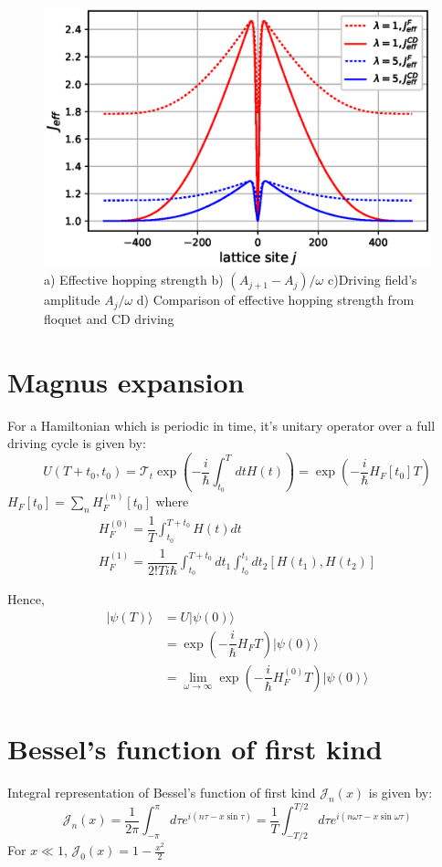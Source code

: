 \documentclass[11pt,a4paper]{article}
\begin{document}
\begin{figure}[!ht]
\begin{center}
\includegraphics[scale=0.5]{pics/j_eff_comp_eckart_potn.eps}
\caption{ a) Effective hopping strength b) $(A_{j+1}-A_{j})/\omega$ c)Driving field's amplitude $A_{j}/\omega$ d) Comparison of effective hopping strength from floquet and CD driving }
\end{center}
\end{figure}

\appendix 
\section{Magnus expansion}
For a Hamiltonian which is periodic in time, it's unitary operator over a full driving cycle is given by:
\begin{equation}
U(T+ t_0, t_0)= \mathcal{T}_t\exp(- \dfrac{i}{\hbar} \int_{t_0}^T dt H(t))= \exp(- \dfrac{i}{\hbar}  H_F[t_0]T)
\end{equation}
$ H_F[t_0]= \sum_n H_F^{(n)}[t_0] $ 
where 
\begin{align*}
H_F^{(0)}= \dfrac{1}{T} \int_{t_0}^{T+t_0} H(t) dt \\
H_F^{(1)}= \dfrac{1}{2! T i \hbar} \int_{t_0}^{T+t_0}  dt_1\int_{t_0}^{t_1} dt_2  [H(t_1), H(t_2)] 
\end{align*}

Hence, 
\begin{align*}
|\psi (T) \rangle &= U |\psi (0) \rangle \\
&= \exp(- \dfrac{i}{\hbar}  H_F T)|\psi (0) \rangle \\
&= \lim_{\omega \rightarrow \infty}\exp(- \dfrac{i}{\hbar}  H_F^{(0)}T)|\psi (0) \rangle
\end{align*}
\section{Bessel's function of first kind}
Integral representation of Bessel's function of first kind $\mathcal{J}_n (x)$ is given by:
\begin{equation}
\mathcal{J}_n (x)=  \frac{1}{2 \pi} \int_{-\pi}^\pi d\tau e^{i(n \tau - x \sin \tau)}= \frac{1}{T} \int_{-T/2}^{T/2} d\tau e^{i(n   \omega \tau - x \sin \omega \tau)}
\end{equation}
For $x \ll1$, $\mathcal{J}_0 (x)= 1- \frac{x^2}{2}$
\end{document}
